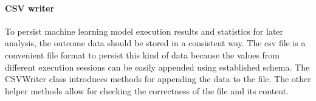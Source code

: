 \paragraph{CSV writer}\label{para:csv-writer}
To persist machine learning model execution results and statistics for later analysis, the outcome data should be stored in a consistent way.
The \gls{csv} file is a convenient file format to persist this kind of data because the values from different execution sessions can be easily appended using established schema.
The CSVWriter class introduces methods for appending the data to the file.
The other helper methods allow for checking the correctness of the file and its content.
